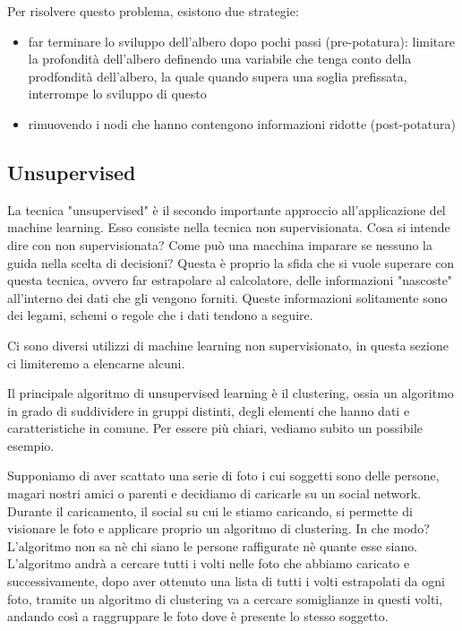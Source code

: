 \documentclass[12pt,italian]{report}
\begin{document}
Per risolvere questo problema, esistono due strategie:
\begin{itemize}
	\item far terminare lo sviluppo dell'albero dopo pochi passi (pre-potatura): limitare la profondità dell'albero definendo una variabile che tenga conto della prodfondità dell'albero, la quale quando supera una soglia prefissata, interrompe lo sviluppo di questo
	
	\item rimuovendo i nodi che hanno contengono informazioni ridotte (post-potatura)
\end{itemize}

\pagebreak
\subsection{Unsupervised}
La tecnica "unsupervised" è il secondo importante approccio all'applicazione del machine learning. Esso consiste nella tecnica non supervisionata. Cosa si intende dire con non supervisionata? Come può una macchina imparare se nessuno la guida nella scelta di decisioni?
Questa è proprio la sfida che si vuole superare con questa tecnica, ovvero far estrapolare al calcolatore, delle informazioni "nascoste" all'interno dei dati che gli vengono forniti. Queste informazioni solitamente sono dei legami, schemi o regole che i dati tendono a seguire.

Ci sono diversi utilizzi di machine learning non supervisionato, in questa sezione ci limiteremo a elencarne alcuni.

Il principale algoritmo di unsupervised learning è il clustering, ossia un algoritmo in grado di suddividere in gruppi distinti, degli elementi che hanno dati e caratteristiche in comune. Per essere più chiari, vediamo subito un possibile esempio.

Supponiamo di aver scattato una serie di foto i cui soggetti sono delle persone, magari nostri amici o parenti e decidiamo di caricarle su un social network. Durante il caricamento, il social su cui le stiamo caricando, si permette di visionare le foto e applicare proprio un algoritmo di clustering. In che modo? L'algoritmo non sa nè chi siano le persone raffigurate nè quante esse siano. L'algoritmo andrà a cercare tutti i volti nelle foto che abbiamo caricato e successivamente, dopo aver ottenuto una lista di tutti i volti estrapolati da ogni foto, tramite un algoritmo di clustering va a cercare somiglianze in questi volti, andando così a raggruppare le foto dove è presente lo stesso soggetto.
\end{document}

